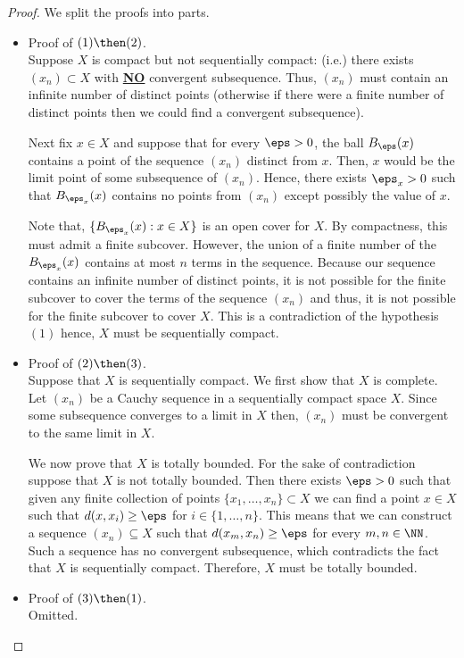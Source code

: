 \documentclass[12pt, a4paper]{article}
\begin{document}
\begin{proof}
    We split the proofs into parts.
    \begin{itemize}
        \item Proof of \((1) \then (2)\). \\
        Suppose \(X\) is compact but not sequentially compact: (i.e.) there exists \((x_n) \subset X\) with \ul{\textbf{NO}} convergent subsequence. Thus, \((x_n)\) must contain an infinite number of distinct points (otherwise if there were a finite number of distinct points then we could find a convergent subsequence).

        Next fix \(x \in X\) and suppose that for every \(\eps >0\), the ball \(B_{\eps}(x)\) contains a point of the sequence \((x_n)\) distinct from \(x\). Then, \(x\) would be the limit point of some subsequence of \((x_n)\). Hence, there exists \(\eps_x>0\) such that \(B_{\eps_x}(x)\) contains no points from \((x_n)\) except possibly the value of \(x\).

        Note that, \(\{B_{\eps_x}(x) : x\in X\}\) is an open cover for \(X\). By compactness, this must admit a finite subcover. However, the union of a finite number of the \(B_{\eps_x}(x)\) contains at most \(n\) terms in the sequence. Because our sequence contains an infinite number of distinct points, it is not possible for the finite subcover to cover the terms of the sequence \((x_n)\) and thus, it is not possible for the finite subcover to cover \(X\). This is a contradiction of the hypothesis \((1)\) hence, \(X\) must be sequentially compact.
        \item Proof of \((2) \then (3)\). \\
        Suppose that \(X\) is sequentially compact. We first show that \(X\) is complete. Let \((x_n)\) be a Cauchy sequence in a sequentially compact space \(X\). Since some subsequence converges to a limit in \(X\) then, \((x_n)\) must be convergent to the same limit in \(X\).

        We now prove that \(X\) is totally bounded. For the sake of contradiction suppose that \(X\) is not totally bounded. Then there exists \(\eps>0\) such that given any finite collection of points \(\{x_1,\ldots,x_n\} \subset X\) we can find a point \(x \in X\) such that \(d(x,x_i)\geq \eps\) for \(i \in \{1,\ldots,n\}\). This means that we can construct a sequence \((x_n) \subseteq X\) such that \(d(x_m,x_n) \geq \eps\) for every \(m,n \in \NN\). Such a sequence has no convergent subsequence, which contradicts the fact that \(X\) is sequentially compact. Therefore, \(X\) must be totally bounded.
        \item Proof of \((3) \then (1)\). \\
        Omitted.
    \end{itemize}
\end{proof}
\end{document}
